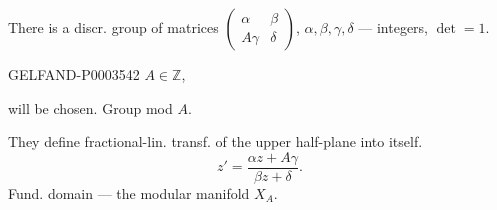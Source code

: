 There is a discr. group of matrices $\begin{pmatrix}\alpha&\beta\\A\gamma&\delta\end{pmatrix}$,
$\alpha,\beta,\gamma,\delta$ --- integers, $\det=1$.

\begin{GelfandAdjacentEvidence}{GELFAND-P000354}{2}
$A\in\mathbb Z$,
\end{GelfandAdjacentEvidence}

will be chosen.
Group mod $A$.

They define fractional-lin. transf. of the upper half-plane into itself.
\begin{equation*}z'=\frac{\alpha z+A\gamma}{\beta z+\delta}.\end{equation*}
Fund. domain --- the modular manifold $X_A$.

